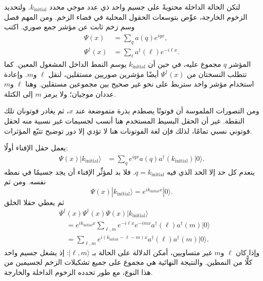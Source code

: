 لتكن الحالة الداخلة محتويةً على جسيم واحد ذي عدد موجي محدد \(k_{\mathrm{initial}}\). ولتحديد الزخوم الخارجة، عوِّض بتوسعات الحقول المحلية في فضاء الزخم. ومن المهم فصل وسم زخم ثابت عن مؤشر جمع صوري. اكتب
\begin{align}
\Psi(x)&=\sum_q a(q)e^{iqx},\\
\Psi^\dagger(x)&=\sum_\ell a^\dagger(\ell)e^{-i\ell x}.
\end{align}
المؤشر \(q\) مجموع عليه، في حين أن \(k_{\mathrm{initial}}\) يوسم النمط الداخل المشغول المعين. كما تتطلب النسختان من \(\Psi^\dagger(x)\) أيضًا مؤشرين صوريين مستقلين، لنقل \(\ell\) و\(m\). وإعادة استخدام مؤشر واحد ستربط على نحو غير صحيح بين مجموعين مستقلين. وهنا \(\ell\) و\(m\) عددان موجيان؛ ولا يرمز \(m\) إلى الكتلة.

ومن التصورات الملموسة أن فوتونًا يصطدم بذرة متموضعة عند \(x\)، ثم يغادر فوتونان تلك النقطة. غير أن الحقل البسيط المستخدم هنا أنسب لجسيمات غير نسبية منه لحقل فوتوني نسبي تمامًا، لذلك فإن لغة الفوتونات هنا لا تؤدي إلا دور توضيح تتبّع المؤثرات.

يعمل حقل الإفناء أولًا:
\begin{align}
\Psi(x)|k_{\mathrm{initial}}\rangle
&=\sum_q e^{iqx}a(q)a^\dagger(k_{\mathrm{initial}})|0\rangle.
\end{align}
ينعدم كل حد إلا الحد الذي فيه \(q=k_{\mathrm{initial}}\). فلا بد لمؤثِّر الإفناء أن يجد جسيمًا في نمطه نفسه. ومن ثم
\begin{equation}
\Psi(x)|k_{\mathrm{initial}}\rangle
=e^{ik_{\mathrm{initial}}x}|0\rangle.
\end{equation}
ثم يعطي حقلا الخلق
\begin{align}
&\Psi^\dagger(x)\Psi^\dagger(x)\Psi(x)
|k_{\mathrm{initial}}\rangle
\\
&\quad=
e^{ik_{\mathrm{initial}}x}
\sum_{\ell,m}
e^{-i\ell x}e^{-imx}
a^\dagger(\ell)a^\dagger(m)|0\rangle
\\
&\quad=
\sum_{\ell,m}
e^{i(k_{\mathrm{initial}}-\ell-m)x}
a^\dagger(\ell)a^\dagger(m)|0\rangle.
\end{align}
وإذا كان \(\ell\) و\(m\) غير متساويين، أمكن الدلالة على الحالة بـ \(|\ell,m\rangle\): إذ يشغل جسيم واحد كلًّا من النمطين. والنتيجة النهائية هي مجموع على جميع تشكيلات الزخم لجسيمين من هذا النوع، مع طور تحدده الزخوم الداخلة والخارجة.

\begin{classroomqa}
\end{classroomqa}


